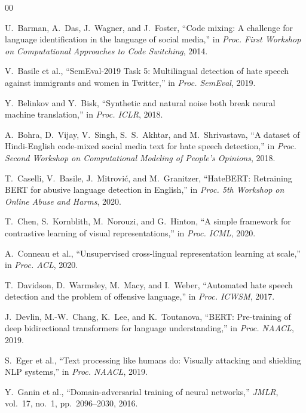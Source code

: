 \documentclass[conference]{IEEEtran}
\begin{document}
\begin{thebibliography}{00}

U.~Barman, A.~Das, J.~Wagner, and J.~Foster, ``Code mixing: A challenge for language identification in the language of social media,'' in \textit{Proc. First Workshop on Computational Approaches to Code Switching}, 2014.

V.~Basile et al., ``SemEval-2019 Task 5: Multilingual detection of hate speech against immigrants and women in Twitter,'' in \textit{Proc. SemEval}, 2019.

Y.~Belinkov and Y.~Bisk, ``Synthetic and natural noise both break neural machine translation,'' in \textit{Proc. ICLR}, 2018.

A.~Bohra, D.~Vijay, V.~Singh, S.~S.~Akhtar, and M.~Shrivastava, ``A dataset of Hindi-English code-mixed social media text for hate speech detection,'' in \textit{Proc. Second Workshop on Computational Modeling of People's Opinions}, 2018.

T.~Caselli, V.~Basile, J.~Mitrovi{\'c}, and M.~Granitzer, ``HateBERT: Retraining BERT for abusive language detection in English,'' in \textit{Proc. 5th Workshop on Online Abuse and Harms}, 2020.

T.~Chen, S.~Kornblith, M.~Norouzi, and G.~Hinton, ``A simple framework for contrastive learning of visual representations,'' in \textit{Proc. ICML}, 2020.

A.~Conneau et al., ``Unsupervised cross-lingual representation learning at scale,'' in \textit{Proc. ACL}, 2020.

T.~Davidson, D.~Warmsley, M.~Macy, and I.~Weber, ``Automated hate speech detection and the problem of offensive language,'' in \textit{Proc. ICWSM}, 2017.

J.~Devlin, M.-W.~Chang, K.~Lee, and K.~Toutanova, ``BERT: Pre-training of deep bidirectional transformers for language understanding,'' in \textit{Proc. NAACL}, 2019.

S.~Eger et al., ``Text processing like humans do: Visually attacking and shielding NLP systems,'' in \textit{Proc. NAACL}, 2019.

Y.~Ganin et al., ``Domain-adversarial training of neural networks,'' \textit{JMLR}, vol.~17, no.~1, pp.~2096--2030, 2016.


\end{thebibliography}
\end{document}
